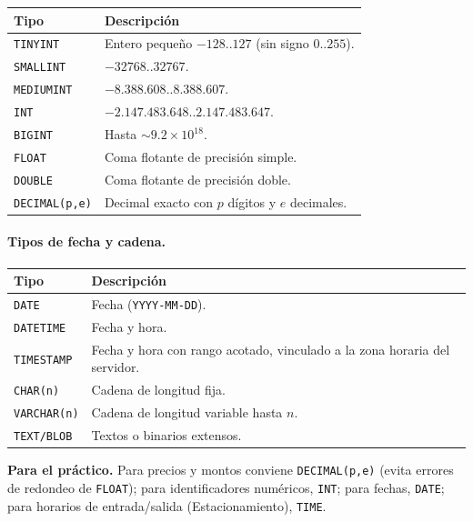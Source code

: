 \documentclass[11pt,a4paper]{article}
\begin{document}
\begin{center}
\begin{tabular}{@{}l p{8.5cm}@{}}
\toprule
\textbf{Tipo} & \textbf{Descripción} \\
\midrule
\texttt{TINYINT}    & Entero pequeño $-128..127$ (sin signo $0..255$). \\
\texttt{SMALLINT}   & $-32768..32767$. \\
\texttt{MEDIUMINT}  & $-8.388.608..8.388.607$. \\
\texttt{INT}        & $-2.147.483.648..2.147.483.647$. \\
\texttt{BIGINT}     & Hasta $\sim 9.2 \times 10^{18}$. \\
\texttt{FLOAT}      & Coma flotante de precisión simple. \\
\texttt{DOUBLE}     & Coma flotante de precisión doble. \\
\texttt{DECIMAL(p,e)} & Decimal exacto con $p$ dígitos y $e$ decimales. \\
\bottomrule
\end{tabular}
\end{center}

\paragraph{Tipos de fecha y cadena.}

\begin{center}
\begin{tabular}{@{}l p{8.5cm}@{}}
\toprule
\textbf{Tipo} & \textbf{Descripción} \\
\midrule
\texttt{DATE}      & Fecha (\texttt{YYYY-MM-DD}). \\
\texttt{DATETIME}  & Fecha y hora. \\
\texttt{TIMESTAMP} & Fecha y hora con rango acotado, vinculado a la zona
                     horaria del servidor. \\
\texttt{CHAR(n)}   & Cadena de longitud fija. \\
\texttt{VARCHAR(n)}& Cadena de longitud variable hasta $n$. \\
\texttt{TEXT/BLOB} & Textos o binarios extensos. \\
\bottomrule
\end{tabular}
\end{center}

\begin{nota}
\textbf{Para el práctico.} Para precios y montos conviene
\texttt{DECIMAL(p,e)} (evita errores de redondeo de \texttt{FLOAT}); para
identificadores numéricos, \texttt{INT}; para fechas, \texttt{DATE}; para
horarios de entrada/salida (Estacionamiento), \texttt{TIME}.
\end{nota}
\end{document}
